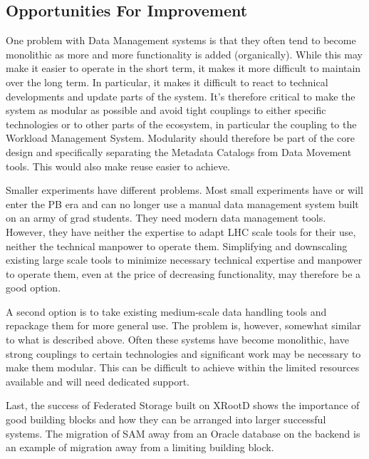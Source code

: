 \subsection{Opportunities For Improvement}
One problem with Data Management systems is that they often tend to become monolithic as more and more functionality is 
added (organically). While this may make it easier to operate in the short term, it makes it more difficult to maintain over 
the long term. In particular, it makes it difficult to react to technical developments and update parts of the system. It's 
therefore critical to make the system as modular as possible and avoid tight couplings to either specific technologies or 
to other parts of the ecosystem, in particular the coupling to the Workload Management System. Modularity should therefore be 
part of the core design and specifically separating the Metadata Catalogs from Data Movement tools. This would also make reuse easier to achieve.
\par Smaller experiments have different problems. Most small experiments have or will enter the PB era and can no longer use a manual 
data management system built on an army of grad students. They need modern data management tools. However, they have neither the 
expertise to adapt LHC scale tools for their use, neither the technical manpower to operate them. Simplifying and downscaling existing 
large scale tools to minimize necessary technical expertise and manpower to operate them, even at the price of decreasing functionality, 
may therefore be a good option. 
\par A second option is to take existing medium-scale data handling tools and repackage them for more general use. The problem is, 
however, somewhat similar to what is described above. Often these systems have become monolithic, have strong couplings to certain 
technologies and significant work may be 
necessary to make them modular. This can be difficult to achieve within the limited resources available and will need dedicated support.
\par Last, the success of Federated Storage built on XRootD shows the importance of good building blocks and how they can be arranged into 
larger successful systems. The migration of SAM away from an Oracle database on the backend is an example of migration away from a limiting building block.


